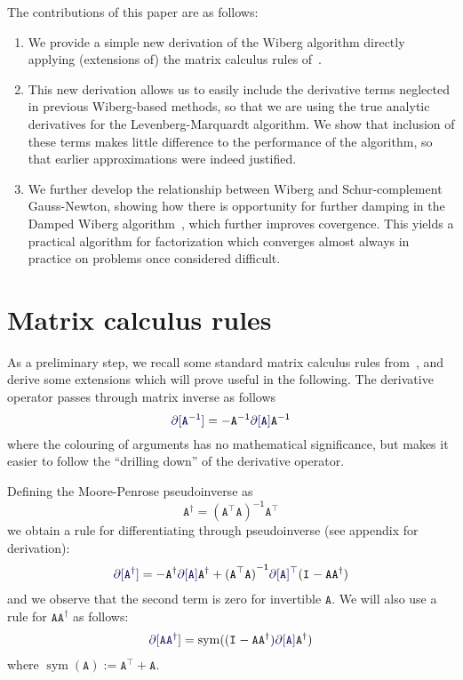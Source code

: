 \documentclass[runningheads]{llncs}
\def\eqlabel#1{\label{eq:#1}}
\def\tr{^\top}
\def\m#1{\ensuremath{\mathtt{#1}}}
\begin{document}
The contributions of this paper are as follows:
\begin{enumerate}
\item We provide a simple new derivation of the Wiberg algorithm directly applying (extensions of) the matrix calculus rules of~\cite{minka00}.
\item This new derivation allows us to easily include the derivative terms neglected in previous Wiberg-based methods, so that we are using the true analytic derivatives for the Levenberg-Marquardt algorithm.   We show that inclusion of these terms makes little difference to the performance of the algorithm, so that earlier approximations were indeed justified.
\item We further develop the relationship between Wiberg and Schur-complement Gauss-Newton, showing how there is opportunity for further damping in the Damped Wiberg algorithm~\cite{okatani2011efficient}, which further improves covergence.   This yields a practical algorithm for factorization which converges almost always in practice on problems once considered difficult.
\end{enumerate}



\def\sym{\operatorname{sym}}
\def\inv#1{{#1}^{\mathsf{-1}}}
\def\mA{\m A}

\def\Id#1{\m{I}_{#1}}
\def\kron#1#2{{#1}\otimes{#2}}
\def\pinv#1{{{#1}^\dagger}}
\def\diff[#1]{\textcolor{diffcol}{\partial[#1]}}

\section{Matrix calculus rules}
As a preliminary step, we recall some standard matrix calculus rules from~\cite{minka00}, and derive some extensions which will prove useful in the following.   The derivative operator passes through matrix inverse as follows
\begin{equation}
\diff[\inv \mA] = -\inv \mA \diff[\mA] \inv \mA
\end{equation}
where the colouring of arguments has no mathematical significance, but makes it easier to follow the ``drilling down'' of the derivative operator.  

Defining the Moore-Penrose pseudoinverse as
\begin{equation}
\pinv \mA = \inv{(\mA\tr \mA)}\mA\tr
\end{equation}
we obtain a rule for differentiating through pseudoinverse (see appendix for derivation):
\begin{align}
\diff[\pinv \mA] = -\pinv \mA \diff[\mA] \pinv \mA +
\inv{(\mA\tr\mA)}\diff[\mA]\tr(\Id{}-\mA\pinv\mA)
\eqlabel{diffpinv}
\end{align}
and we observe that the second term is zero for invertible \mA.  We will also use a rule for $\mA \pinv \mA$ as follows:
\begin{align}
\diff[\mA \pinv \mA] = \sym((\Id{} - \mA\pinv \mA) \diff[\mA] \pinv \mA)
\end{align}
where $\sym(\mA) := \mA\tr + \mA$. 
\end{document}
